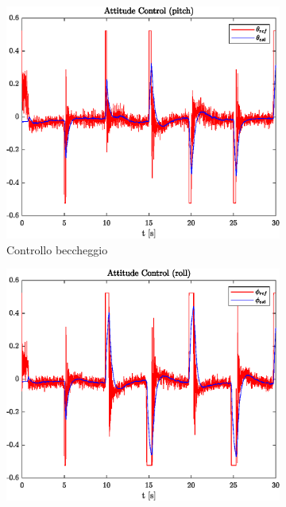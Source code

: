 \begin{figure}
	\centering
	\begin{subfigure}{0.45\textwidth}
		\centering
		\includegraphics[width=1\textwidth]{Simulazioni/Figure/PID/BUTTERFLY/AttitudeControlPitch}
		\caption{Controllo beccheggio}
	\end{subfigure}
	\hfill
	\begin{subfigure}{0.45\textwidth}
		\centering
		\includegraphics[width=1\textwidth]{Simulazioni/Figure/PID/BUTTERFLY/AttitudeControlRoll}

\end{subfigure}
\end{figure}

